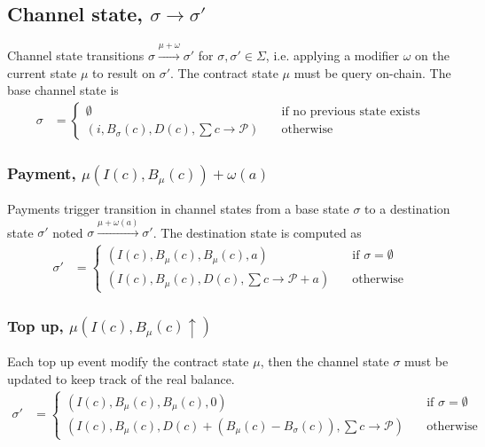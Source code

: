 \documentclass{llncs}
\begin{document}
\subsection{Channel state, $\sigma \rightarrow \sigma'$} Channel state transitions $\sigma \xrightarrow{\mu + \omega} \sigma'$ for $\sigma, \sigma' \in \Sigma$, i.e. applying a modifier $\omega$ on the current state $\mu$ to result on $\sigma'$. The contract state $\mu$ must be query on-chain. The base channel state is
\begin{equation*}
\begin{split}
  \sigma &=
  \begin{cases}
    \emptyset & \quad \text{if no previous state exists} \\
    (i, B_\sigma(c), D(c), \textstyle \sum c \rightarrow \mathcal{P}) & \quad \text{otherwise}
  \end{cases}
\end{split}
\end{equation*}

\subsubsection{Payment, $\mu(I(c), B_\mu(c))+\omega(a)$} Payments trigger transition in channel states from a base state $\sigma$ to a destination state $\sigma'$ noted $\sigma \xrightarrow{\mu + \omega(a)} \sigma'$.
The destination state is computed as
\begin{equation*}
\begin{split}
  \sigma' &=
  \begin{cases}
      (I(c), B_\mu(c), B_\mu(c), a) & \quad \text{if } \sigma = \emptyset \\
      (I(c), B_\mu(c), D(c), \textstyle \sum c \rightarrow \mathcal{P}+a) & \quad \text{otherwise}
  \end{cases}
\end{split}
\end{equation*}

\subsubsection{Top up, $\mu(I(c), B_\mu(c) \uparrow)$} Each top up event modify the contract state $\mu$, then the channel state $\sigma$ must be updated to keep track of the real balance.
\begin{equation*}
\begin{split}
  \sigma' &=
  \begin{cases}
      (I(c), B_\mu(c), B_\mu(c), 0) & \quad \text{if } \sigma = \emptyset \\
      (I(c), B_\mu(c), D(c) + (B_\mu(c) - B_\sigma(c)), \textstyle \sum c \rightarrow \mathcal{P}) & \quad \text{otherwise}
  \end{cases}
\end{split}
\end{equation*}
\end{document}
